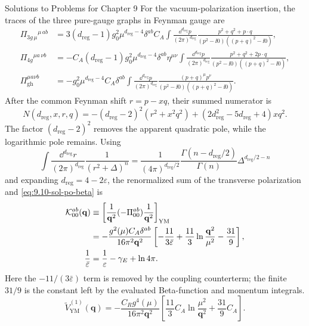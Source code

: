 \begin{bankssolutions}{Solutions to Problems for Chapter 9}
For the vacuum-polarization insertion, the traces of the three pure-gauge
graphs in Feynman gauge are
\begin{align*}
 \Pi_{3g\,\mu}{}^{\mu\,ab}&=
 3(d_{\mathrm{reg}}-1)g_0^2\mu^{d_{\mathrm{reg}}-4}\delta^{ab}C_A
 \int\frac{\dd^{d_{\mathrm{reg}}}p}{(2\pi)^{d_{\mathrm{reg}}}}
 \frac{p^2+q^2+p\mathbin{\cdot}q}{(p^2-\ii0)((p+q)^2-\ii0)},\\
 \Pi_{4g}{}^{\mu a\,\nu b}&=-C_A(d_{\mathrm{reg}}-1)g_0^2\mu^{d_{\mathrm{reg}}-4}\delta^{ab}\eta^{\mu\nu}
 \int\frac{\dd^{d_{\mathrm{reg}}}p}{(2\pi)^{d_{\mathrm{reg}}}}
 \frac{p^2+q^2+2p\mathbin{\cdot}q}{(p^2-\ii0)((p+q)^2-\ii0)},\\
 \Pi_{\mathrm{gh}}^{\mu a\nu b}&=-g_0^2\mu^{d_{\mathrm{reg}}-4}C_A\delta^{ab}
 \int\frac{\dd^{d_{\mathrm{reg}}}p}{(2\pi)^{d_{\mathrm{reg}}}}
 \frac{(p+q)^\mu p^\nu}{(p^2-\ii0)((p+q)^2-\ii0)}.
\end{align*}
After the common Feynman shift $r=p-xq$, their summed numerator is
\[
 N(d_{\mathrm{reg}},x,r,q)=-(d_{\mathrm{reg}}-2)^2(r^2+x^2q^2)
 +(2d_{\mathrm{reg}}^2-5d_{\mathrm{reg}}+4)xq^2.
\]
The factor $(d_{\mathrm{reg}}-2)^2$ removes the apparent quadratic pole, while the
logarithmic pole remains.  Using
\[
 \int\frac{\dd^{d_{\mathrm{reg}}}r}{(2\pi)^{d_{\mathrm{reg}}}}
 \frac{1}{(r^2+\Delta)^n}
 =\frac{1}{(4\pi)^{d_{\mathrm{reg}}/2}}
 \frac{\Gamma(n-d_{\mathrm{reg}}/2)}{\Gamma(n)}
 \Delta^{d_{\mathrm{reg}}/2-n}
\]
and expanding $d_{\mathrm{reg}}=4-2\varepsilon$, the renormalized sum of the transverse
polarization and \eqref{eq:9.10-sol-po-beta} is
\begin{align}
 {\cal K}_{00}^{ab}(\mathbf q)
 &\equiv\left[\frac{1}{\mathbf q^2}(-\Pi_{00}^{ab})
 \frac{1}{\mathbf q^2}\right]_{\rm YM}\nonumber\\
 &=-\frac{g^2(\mu)C_A\delta^{ab}}{16\pi^2\mathbf q^2}
 \left[-\frac{11}{3\bar\varepsilon}
 +\frac{11}{3}\ln\frac{\mathbf q^2}{\mu^2}-\frac{31}{9}\right],\\
 \frac1{\bar\varepsilon}&=\frac1\varepsilon-\gamma_E+\ln4\pi .
 \label{eq:9.10-sol-coulomb-finite}
\end{align}
Here the $-11/(3\bar\varepsilon)$ term is removed by the coupling
counterterm; the finite $31/9$ is the constant left by the evaluated
Beta-function and momentum integrals.
\begin{equation}
 \widetilde V_{\mathrm{YM}}^{(1)}(\mathbf q)
 =-\frac{C_Rg^4(\mu)}{16\pi^2\mathbf q^2}
 \left[\frac{11}{3}C_A\ln\frac{\mu^2}{\mathbf q^2}
       +\frac{31}{9}C_A\right].
 \label{eq:9.10-sol-finite-kernel}
\end{equation}

\end{bankssolutions}
